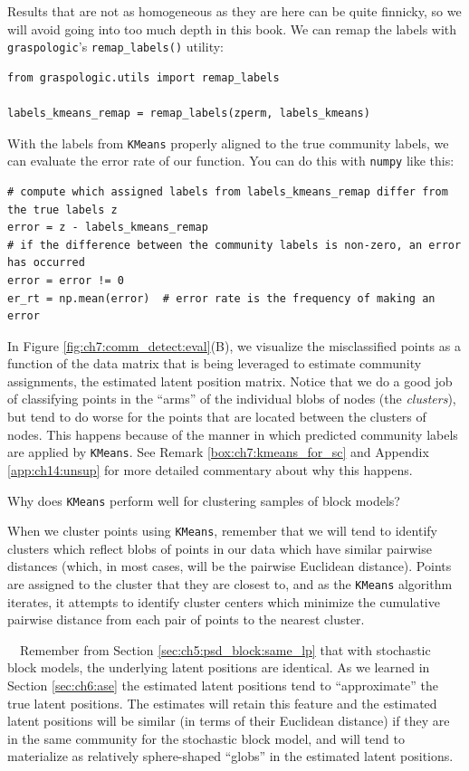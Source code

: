 Results that are not as homogeneous as they are here can be quite finnicky, so we will avoid going into too much depth in this book. We can remap the labels with \texttt{graspologic}'s \texttt{remap\_labels()} utility:

\begin{lstlisting}[style=python]
from graspologic.utils import remap_labels

labels_kmeans_remap = remap_labels(zperm, labels_kmeans)
\end{lstlisting}
With the labels from \texttt{KMeans} properly aligned to the true community labels, we can evaluate the error rate of our function. You can do this with \texttt{numpy} like this:

\begin{lstlisting}[style=python]
# compute which assigned labels from labels_kmeans_remap differ from the true labels z
error = z - labels_kmeans_remap
# if the difference between the community labels is non-zero, an error has occurred
error = error != 0
er_rt = np.mean(error)  # error rate is the frequency of making an error
\end{lstlisting}

In Figure \ref{fig:ch7:comm_detect:eval}(B), we visualize the misclassified points as a function of the data matrix that is being leveraged to estimate community assignments, the estimated latent position matrix. Notice that we do a good job of classifying points in the ``arms'' of the individual blobs of nodes (the \textit{clusters}), but tend to do worse for the points that are located between the clusters of nodes. This happens because of the manner in which predicted community labels are applied by \texttt{KMeans}. See Remark \ref{box:ch7:kmeans_for_sc} and Appendix \ref{app:ch14:unsup} for more detailed commentary about why this happens.

\begin{floatingbox}[h]\caption{Why does \texttt{KMeans} perform well for clustering samples of block models?}
\label{box:ch7:kmeans_for_sc}
When we cluster points using \texttt{KMeans}, remember that we will tend to identify clusters which reflect blobs of points in our data which have similar pairwise distances (which, in most cases, will be the pairwise Euclidean distance). Points are assigned to the cluster that they are closest to, and as the \texttt{KMeans} algorithm iterates, it attempts to identify cluster centers which minimize the cumulative pairwise distance from each pair of points to the nearest cluster. 

\,\,\,\, Remember from Section \ref{sec:ch5:psd_block:same_lp} that with stochastic block models, the underlying latent positions are identical. As we learned in Section \ref{sec:ch6:ase} the estimated latent positions tend to ``approximate'' the true latent positions. The estimates will retain this feature and the estimated latent positions will be similar (in terms of their Euclidean distance) if they are in the same community for the stochastic block model, and will tend to materialize as relatively sphere-shaped ``globs'' in the estimated latent positions. 
\end{floatingbox}

